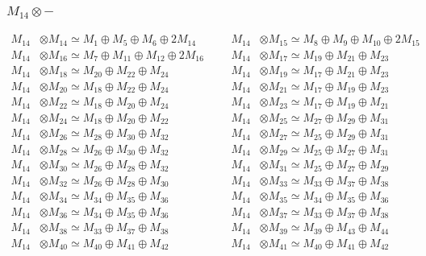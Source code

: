 \subsubsection{$ M_{14}\otimes -$}
\begin{align*}
M_{14} &\otimes M_{14} \simeq M_{1} \oplus M_{5} \oplus M_{6} \oplus 2M_{14} &&& M_{14} &\otimes M_{15} \simeq M_{8} \oplus M_{9} \oplus M_{10} \oplus 2M_{15}\\
M_{14} &\otimes M_{16} \simeq M_{7} \oplus M_{11} \oplus M_{12} \oplus 2M_{16} &&& M_{14} &\otimes M_{17} \simeq M_{19} \oplus M_{21} \oplus M_{23}\\
M_{14} &\otimes M_{18} \simeq M_{20} \oplus M_{22} \oplus M_{24} &&& M_{14} &\otimes M_{19} \simeq M_{17} \oplus M_{21} \oplus M_{23}\\
M_{14} &\otimes M_{20} \simeq M_{18} \oplus M_{22} \oplus M_{24} &&& M_{14} &\otimes M_{21} \simeq M_{17} \oplus M_{19} \oplus M_{23}\\
M_{14} &\otimes M_{22} \simeq M_{18} \oplus M_{20} \oplus M_{24} &&& M_{14} &\otimes M_{23} \simeq M_{17} \oplus M_{19} \oplus M_{21}\\
M_{14} &\otimes M_{24} \simeq M_{18} \oplus M_{20} \oplus M_{22} &&& M_{14} &\otimes M_{25} \simeq M_{27} \oplus M_{29} \oplus M_{31}\\
M_{14} &\otimes M_{26} \simeq M_{28} \oplus M_{30} \oplus M_{32} &&& M_{14} &\otimes M_{27} \simeq M_{25} \oplus M_{29} \oplus M_{31}\\
M_{14} &\otimes M_{28} \simeq M_{26} \oplus M_{30} \oplus M_{32} &&& M_{14} &\otimes M_{29} \simeq M_{25} \oplus M_{27} \oplus M_{31}\\
M_{14} &\otimes M_{30} \simeq M_{26} \oplus M_{28} \oplus M_{32} &&& M_{14} &\otimes M_{31} \simeq M_{25} \oplus M_{27} \oplus M_{29}\\
M_{14} &\otimes M_{32} \simeq M_{26} \oplus M_{28} \oplus M_{30} &&& M_{14} &\otimes M_{33} \simeq M_{33} \oplus M_{37} \oplus M_{38}\\
M_{14} &\otimes M_{34} \simeq M_{34} \oplus M_{35} \oplus M_{36} &&& M_{14} &\otimes M_{35} \simeq M_{34} \oplus M_{35} \oplus M_{36}\\
M_{14} &\otimes M_{36} \simeq M_{34} \oplus M_{35} \oplus M_{36} &&& M_{14} &\otimes M_{37} \simeq M_{33} \oplus M_{37} \oplus M_{38}\\
M_{14} &\otimes M_{38} \simeq M_{33} \oplus M_{37} \oplus M_{38} &&& M_{14} &\otimes M_{39} \simeq M_{39} \oplus M_{43} \oplus M_{44}\\
M_{14} &\otimes M_{40} \simeq M_{40} \oplus M_{41} \oplus M_{42} &&& M_{14} &\otimes M_{41} \simeq M_{40} \oplus M_{41} \oplus M_{42}\\

\end{align*}
